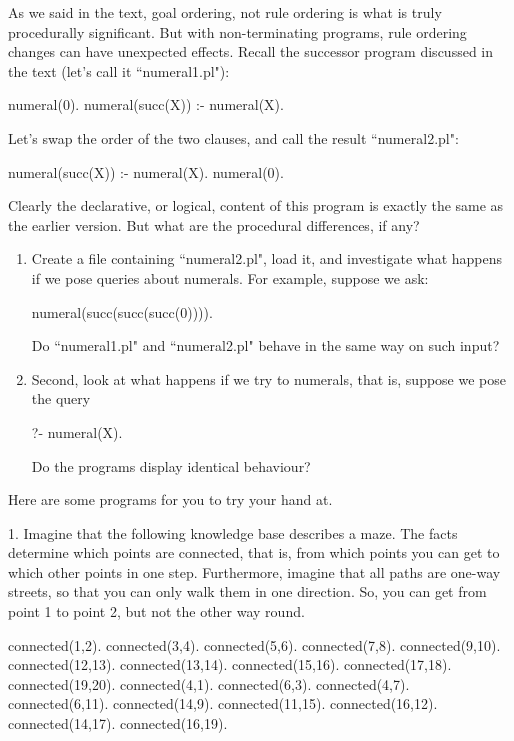 As we said in the text, goal ordering, not rule ordering is
what is truly  procedurally significant.  But with non-terminating programs,
rule ordering changes can have unexpected effects.  Recall the
successor program discussed in the text (let's call it ``numeral1.pl"):
\begin{LPNcodedisplay}
numeral(0).
numeral(succ(X)) :- numeral(X).
\end{LPNcodedisplay}
Let's  swap the order of the two clauses, and
call the result ``numeral2.pl":
\begin{LPNcodedisplay}
numeral(succ(X)) :- numeral(X).
numeral(0).
\end{LPNcodedisplay}
Clearly the declarative, or logical, content of this program is
exactly the same as the earlier version. But what are the procedural
differences, if any?

\begin{enumerate}

\item{} Create a file containing ``numeral2.pl", load it, and
investigate what happens if we pose  queries about
 numerals.
For example, suppose we ask:
\begin{LPNcodedisplay}
numeral(succ(succ(succ(0)))).
\end{LPNcodedisplay}
Do ``numeral1.pl" and ``numeral2.pl" behave in the same way on such
input?

\item{}
Second, look at what happens if we try to  numerals, that
is, suppose we pose the query
\begin{LPNcodedisplay}
?- numeral(X).
\end{LPNcodedisplay}
Do the programs display identical behaviour?
\end{enumerate}

Here are  some programs for you to try your hand at.

1. Imagine that the following knowledge base describes a maze. The facts
determine which points are connected, that is, from which points you can
get to which other points in one step. Furthermore, imagine that all
paths are one-way streets, so that you can only walk them in one
direction. So, you can get from point 1 to point 2, but not the other
way round.
\begin{LPNcodedisplay}
connected(1,2).
connected(3,4).
connected(5,6).
connected(7,8).
connected(9,10).
connected(12,13).
connected(13,14).
connected(15,16).
connected(17,18).
connected(19,20).
connected(4,1).
connected(6,3).
connected(4,7).
connected(6,11).
connected(14,9).
connected(11,15).
connected(16,12).
connected(14,17).
connected(16,19).
\end{LPNcodedisplay}

